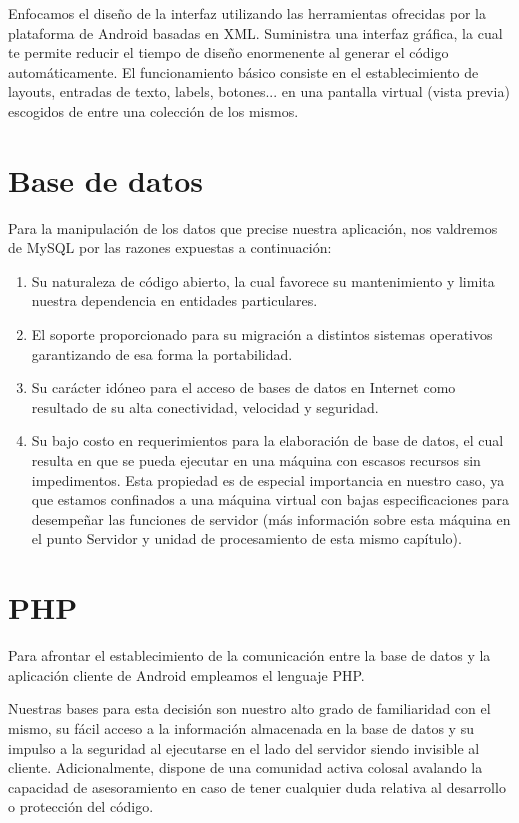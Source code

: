 \documentclass[11pt,spanish,
		listoftables,listoffigures]
		{tfgplantilla}
\begin{document}
Enfocamos el diseño de la interfaz utilizando las herramientas ofrecidas por la plataforma de Android basadas en XML. Suministra una interfaz gráfica, la cual te permite reducir el tiempo de diseño enormenente al generar el código automáticamente. El funcionamiento básico consiste en el establecimiento de layouts, entradas de texto, labels, botones... en una pantalla virtual (vista previa) escogidos de entre una colección de los mismos. 

\section {Base de datos}

Para la manipulación de los datos que precise nuestra aplicación, nos valdremos de MySQL por las razones expuestas a continuación:

\begin{enumerate}
	\item Su naturaleza de código abierto, la cual favorece su mantenimiento y limita nuestra dependencia en entidades particulares.

	\item El soporte proporcionado para su migración a distintos sistemas operativos garantizando de esa forma la portabilidad.

	\item Su carácter idóneo para el acceso de bases de datos en Internet como resultado de su alta conectividad, velocidad y seguridad.

	\item Su bajo costo en requerimientos para la elaboración de base de datos, el cual resulta en que se pueda ejecutar en una máquina con escasos recursos sin impedimentos. Esta propiedad es de especial importancia en nuestro caso, ya que estamos confinados a una máquina virtual con bajas especificaciones para  desempeñar las funciones de servidor (más información sobre esta máquina en el punto Servidor y unidad de procesamiento de esta mismo capítulo).
\end{enumerate}

\section {PHP}

Para afrontar el establecimiento de la comunicación entre la base de datos y la aplicación cliente de Android empleamos el lenguaje PHP.

Nuestras bases para esta decisión son nuestro alto grado de familiaridad con el mismo, su fácil acceso a la información almacenada en la base de datos y su impulso a la seguridad al ejecutarse en el lado del servidor siendo invisible al cliente. Adicionalmente, dispone de una comunidad activa colosal avalando la capacidad de asesoramiento en caso de tener cualquier duda relativa al desarrollo o protección del código.
\end{document}

